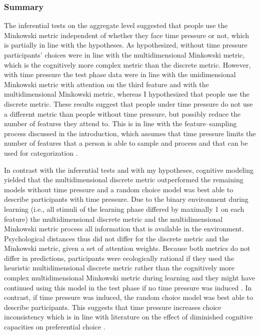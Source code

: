 \documentclass[a4paper,man,natbib]{apa6}
\begin{document}
\subsubsection{Summary}
The inferential tests on the aggregate level suggested that people use the Minkowski metric independent of whether they face time pressure or not, which is partially in line with the hypotheses. As hypothesized, without time pressure participants' choices were in line with the multidimensional Minkowski metric, which is the cognitively more complex metric than the discrete metric. However, with time pressure the test phase data were in line with the unidimensional Minkowski metric with attention on the third feature and with the multidimensional Minkowski metric, whereas I hypothesized that people use the discrete metric. These results suggest that people under time pressure do not use a different metric than people without time pressure, but possibly reduce the number of features they attend to. This is in line with the feature--sampling process discussed in the introduction, which assumes that time pressure limits the number of features that a person is able to sample and process and that can be used for categorization \citep{lamberts1995categorization}.  

In contrast with the inferential tests and with my hypotheses, cognitive modeling yielded that the multidimensional discrete metric outperformed the remaining models without time pressure and a random choice model was best able to describe participants with time pressure. Due to the binary environment during learning (i.e., all stimuli of the learning phase differed by maximally 1 on each feature) the multidimensional discrete metric and the multidimensional Minkowski metric process all information that is available in the environment. Psychological distances thus did not differ for the discrete metric and the Minkowski metric, given a set of attention weights. Because both metrics do not differ in predictions, participants were ecologically rational if they used the heuristic multidimensional discrete metric rather than the cognitively more complex multidimensional Minkowski metric during learning and they might have continued using this model in the test phase if no time pressure was induced \citep{todd2007environments}. In contrast, if time pressure was induced, the random choice model was best able to describe participants. This suggests that time pressure increases choice inconsistency which is in line with literature on the effect of diminished cognitive capacities on preferential choice \citep[][see also the Discussion]{olschewski2018taxing, burks2009cognitive}. 
\end{document}
